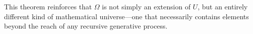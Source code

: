 \documentclass[12pt]{article}
\begin{document}
This theorem reinforces that \( \Omega \) is not simply an extension of \( U \), but an entirely different kind of mathematical universe—one that necessarily contains elements beyond the reach of any recursive generative process.








\end{document}
